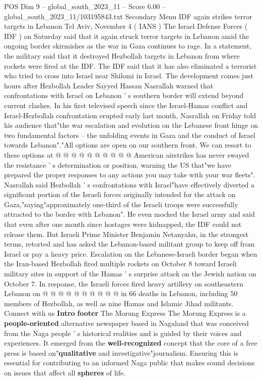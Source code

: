 \begin{textsample}{POS Dim 9 – global\_south\_2023\_11 – Score 6.00 – global\_south\_2023\_11/103195843.txt}  \label{ex:f9_pos_025}
Secondary Menu IDF again strikes terror targets in Lebanon Tel Aviv, November 4 ( IANS ) The Israel Defense Forces ( IDF ) on Saturday said that it again struck terror targets in Lebanon amid the ongoing border skirmishes as the war in Gaza continues to rage.
In a statement, the military said that it destroyed Hezbollah targets in Lebanon from where rockets were fired at the IDF.
The IDF said that it has also eliminated a terrorist who tried to cross into Israel near Shilomi in Israel.
The development comes just hours after Hezbollah Leader Sayyed Hassan Nasrallah warned that confrontations with Israel on Lebanon ' s southern border will extend beyond current clashes.
In his first televised speech since the Israel-Hamas conflict and Israel-Hezbollah confrontation erupted early last month, Nasrallah on Friday told his audience that"the war escalation and evolution on the Lebanese front hinge on two fundamental factors -- the unfolding events in Gaza and the conduct of Israel towards Lebanon"."All options are open on our southern front.
We can resort to these options at @ @ @ @ @ @ @ @ @ @ American airstrikes has never swayed the resistance ' s determination or position, warning the US that"we have prepared the proper responses to any actions you may take with your war fleets".
Nasrallah said Hezbollah ' s confrontations with Israel"have effectively diverted a significant portion of the Israeli forces originally intended for the attack on Gaza,"saying"approximately one-third of the Israeli troops were successfully attracted to the border with Lebanon".
He even mocked the Israel army and said that even after one month since hostages were kidnapped, the IDF could not release them.
But Israeli Prime Minister Benjamin Netanyahu, in the strongest terms, retorted and has asked the Lebanon-based militant group to keep off from Israel or pay a heavy price.
Escalation on the Lebanese-Israeli border began when the Iran-based Hezbollah fired multiple rockets on October 8 toward Israeli military sites in support of the Hamas ' s surprise attack on the Jewish nation on October 7.
In response, the Israeli forces fired heavy artillery on southeastern Lebanon on @ @ @ @ @ @ @ @ @ @ in 66 deaths in Lebanon, including 50 members of Hezbollah, as well as nine Hamas and Islamic Jihad militants.
Connect with us \textbf{Intro} \textbf{footer} The Morung Express The Morung Express is a \textbf{people-oriented} alternative newspaper based in Nagaland that was conceived from the Naga people ' s historical realities and is guided by their voices and experiences.
It emerged from the \textbf{well-recognized} concept that the core of a free press is based on"\textbf{qualitative} and investigative"journalism.
Ensuring this is essential for contributing to an informed Naga public that makes sound decisions on issues that affect all \textbf{spheres} of life.

\end{textsample}
